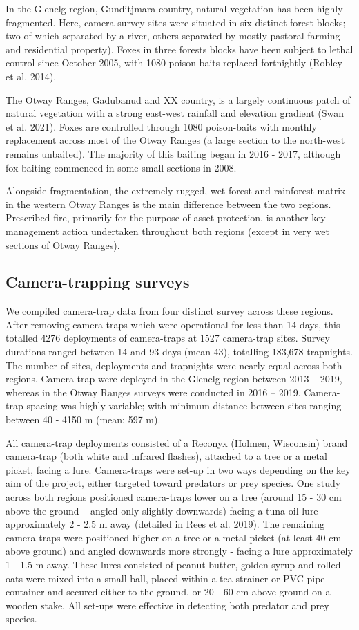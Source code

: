 \documentclass[]{elsarticle} %
\begin{document}
In the Glenelg region, Gunditjmara country, natural vegetation has been highly fragmented. Here, camera-survey sites were situated in six distinct forest blocks; two of which separated by a river, others separated by mostly pastoral farming and residential property). Foxes in three forests blocks have been subject to lethal control since October 2005, with 1080 poison-baits replaced fortnightly (Robley et al. 2014).

The Otway Ranges, Gadubanud and XX country, is a largely continuous patch of natural vegetation with a strong east-west rainfall and elevation gradient (Swan et al. 2021). Foxes are controlled through 1080 poison-baits with monthly replacement across most of the Otway Ranges (a large section to the north-west remains unbaited). The majority of this baiting began in 2016 - 2017, although fox-baiting commenced in some small sections in 2008.

Alongside fragmentation, the extremely rugged, wet forest and rainforest matrix in the western Otway Ranges is the main difference between the two regions. Prescribed fire, primarily for the purpose of asset protection, is another key management action undertaken throughout both regions (except in very wet sections of Otway Ranges).

\hypertarget{camera-trapping-surveys}{%
\subsection{Camera-trapping surveys}\label{camera-trapping-surveys}}

We compiled camera-trap data from four distinct survey across these regions. After removing camera-traps which were operational for less than 14 days, this totalled 4276 deployments of camera-traps at 1527 camera-trap sites. Survey durations ranged between 14 and 93 days (mean 43), totalling 183,678 trapnights. The number of sites, deployments and trapnights were nearly equal across both regions. Camera-trap were deployed in the Glenelg region between 2013 -- 2019, whereas in the Otway Ranges surveys were conducted in 2016 -- 2019. Camera-trap spacing was highly variable; with minimum distance between sites ranging between 40 - 4150 m (mean: 597 m).

All camera-trap deployments consisted of a Reconyx (Holmen, Wisconsin) brand camera-trap (both white and infrared flashes), attached to a tree or a metal picket, facing a lure. Camera-traps were set-up in two ways depending on the key aim of the project, either targeted toward predators or prey species. One study across both regions positioned camera-traps lower on a tree (around 15 - 30 cm above the ground -- angled only slightly downwards) facing a tuna oil lure approximately 2 - 2.5 m away (detailed in Rees et al. 2019). The remaining camera-traps were positioned higher on a tree or a metal picket (at least 40 cm above ground) and angled downwards more strongly - facing a lure approximately 1 - 1.5 m away. These lures consisted of peanut butter, golden syrup and rolled oats were mixed into a small ball, placed within a tea strainer or PVC pipe container and secured either to the ground, or 20 - 60 cm above ground on a wooden stake. All set-ups were effective in detecting both predator and prey species.
\end{document}
